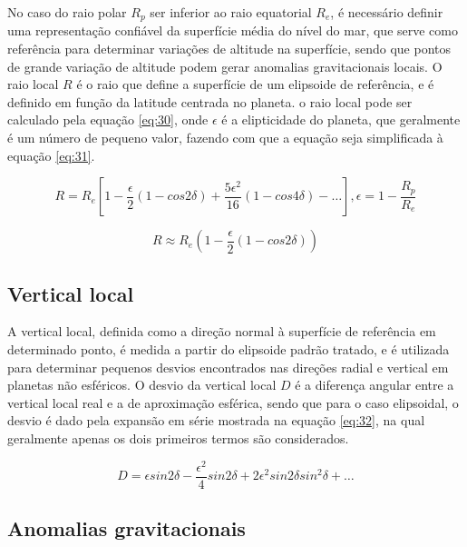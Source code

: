 No caso do raio polar $R_{p}$ ser inferior ao raio equatorial $R_{e}$, é necessário definir uma representação confiável da superfície média do nível do mar, que serve como referência para determinar variações de altitude na superfície, sendo que pontos de grande variação de altitude podem gerar anomalias gravitacionais locais. O raio local $R$ é o raio que define a superfície de um elipsoide de referência, e é definido em função da latitude centrada no planeta. o raio local pode ser calculado pela equação \ref{eq:30}, onde $\epsilon$ é a elipticidade do planeta, que geralmente é um número de pequeno valor, fazendo com que a equação seja simplificada à equação \ref{eq:31}.

\begin{equation}
    R = R_{e} \left[ 1 - \frac{\epsilon}{2} (1-cos2\delta) + \frac{5\epsilon^{2}}{16}(1-cos4\delta) -\dots \right], \epsilon = 1- \frac{R_{p}}{R_{e}}
    \label{eq:30}
\end{equation}

\begin{equation}
    R \approx R_{e} \left(  1-\frac{\epsilon}{2}(1-cos2\delta) \right)
    \label{eq:31}
\end{equation}

\subsection{Vertical local}

A vertical local, definida como a direção normal à superfície de referência em determinado ponto, é medida a partir do elipsoide padrão tratado, e é utilizada para determinar pequenos desvios encontrados nas direções radial e vertical em planetas não esféricos. O desvio da vertical local $D$ é a diferença angular entre a vertical local real e a de aproximação esférica, sendo que para o caso elipsoidal, o desvio é dado pela expansão em série mostrada na equação \ref{eq:32}, na qual geralmente apenas os dois primeiros termos são considerados. 

\begin{equation}
    D = \epsilon sin 2\delta - \frac{\epsilon^{2}}{4}sin2\delta + 2\epsilon^{2} sin 2\delta sin^{2}\delta + \dots
    \label{eq:32}
\end{equation}
 
\subsection{Anomalias gravitacionais}

